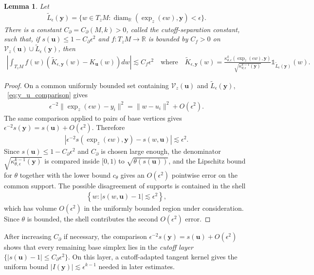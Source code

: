 \documentclass[11pt,reqno]{amsproc}
\numberwithin{equation}{section}
\newcommand{\R}{\mathbb{R}}
\newcommand{\one}{\mathbb{1}}
\newcommand{\by}{\mathbf{y}}
\newcommand{\bu}{\mathbf{u}}
\newcommand{\cV}{\mathcal{V}}
\newcommand{\tL}{\widetilde{L}}
\newcommand{\ls}{\lesssim}
\newcommand{\diam}{\operatorname{diam}}
\newtheorem{lemma}[counter]{Lemma}
\theoremstyle{definition}
\theoremstyle{plain}
\begin{document}
\begin{lemma} \label{lem:codiff_I_support}
    Let
    \begin{align}
        \tL_\epsilon(\by)=\{w\in T_zM: \diam_\R(\exp_z(\epsilon w),\by)<\epsilon\}.
    \end{align}
    There is a constant $C_\partial=C_\partial(M,k)>0$, called the \emph{cutoff-separation constant}, such that, if $s(\bu)\leq 1-C_\partial\epsilon^2$ and $f:T_zM\to \R$ is bounded by $C_f> 0$ on $\cV_z(\bu)\cup \tL_\epsilon(\by)$, then
    \begin{align} \label{eq:codiff_support_integral}
        \left|\int_{T_zM} f(w)(\widetilde{K}_{\epsilon,\by}(w)-K_\bu(w))dw\right| 
        \ls C_f\epsilon^2 \quad \text{where} \quad \widetilde{K}_{\epsilon,\by}(w) = \frac{\kappa^k_{\theta,\epsilon}(\exp_z(\epsilon w),\by)}{\sqrt{\kappa^{k-1}_{\theta,\epsilon}(\by)}}\one_{\tL_\epsilon(\by)}(w).
    \end{align}
\end{lemma}
\begin{proof}
    On a common uniformly bounded set containing $\cV_z(\bu)$ and $\tL_\epsilon(\by)$, ~\eqref{eq:y_u_comparison} gives
    \begin{align}
        \epsilon^{-2}\|\exp_z(\epsilon w)-y_i\|^2 = \|w-u_i\|^2+O(\epsilon^2).
    \end{align}
    The same comparison applied to pairs of base vertices gives $\epsilon^{-2}s(\by)=s(\bu)+O(\epsilon^2)$. Therefore
    \begin{align}
        \left|\epsilon^{-2}s(\exp_z(\epsilon w),\by)-s(w,\bu)\right|\ls \epsilon^2.
    \end{align}
    Since $s(\bu)\leq 1-C_\partial\epsilon^2$ and $C_\partial$ is chosen large enough, the denominator $\sqrt{\kappa^{k-1}_{\theta,\epsilon}(\by)}$ is compared inside $[0,1)$ to $\sqrt{\theta(s(\bu))}$, and the Lipschitz bound for $\theta$ together with the lower bound $c_\theta$ gives an $O(\epsilon^2)$ pointwise error on the common support. The possible disagreement of supports is contained in the shell
    \begin{align}
        \left\{w:\left|s(w,\bu)-1\right|\ls \epsilon^2\right\},
    \end{align}
    which has volume $O(\epsilon^2)$ in the uniformly bounded region under consideration. Since $\theta$ is bounded, the shell contributes the second $O(\epsilon^2)$ error.
\end{proof}

After increasing $C_\partial$ if necessary, the comparison $\epsilon^{-2}s(\by)=s(\bu)+O(\epsilon^2)$ shows that every remaining base simplex lies in the \emph{cutoff layer} $\{|s(\bu)-1|\leq C_\partial\epsilon^2\}$. On this layer, a cutoff-adapted tangent kernel gives the uniform bound $|I(\by)|\ls\epsilon^{k-1}$ needed in later estimates.
\end{document}
